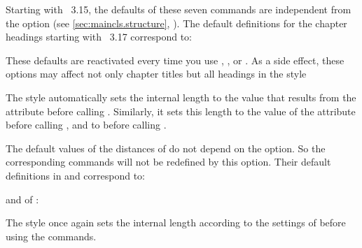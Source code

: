 Starting with \KOMAScript~3.15, the defaults of these seven commands
are independent from the  option (see
\autoref{sec:maincls.structure},
). The default definitions for the
chapter headings starting with
\KOMAScript~3.17 correspond to:
\begin{lstcode}
  \newcommand*{\chapterheadstartvskip}{\vspace{\@tempskipa}}
  \newcommand*{\chapterheadmidvskip}{\par\nobreak\vskip\@tempskipa}
  \newcommand*{\chapterheadendvskip}{\vskip\@tempskipa}
\end{lstcode}
These defaults are reactivated every time you use
,
, or
. As a side effect, these options may
affect not only chapter titles but all headings in the  style

The  style automatically sets the internal length
 to the value that results from the
attribute  before calling .
Similarly, it sets this length to the value of the 
attribute before calling , and to
 before calling .

The default values of the distances of  do not
depend on the  option. So the corresponding
commands will not be redefined by this option.
Their default definitions in  and 
correspond to:
\begin{lstcode}
  \newcommand*{\partheadstartvskip}{%
    \null\vskip-\baselineskip\vskip\@tempskipa
  }
  \newcommand*{\partheadmidvskip}{%
    \par\nobreak
    \vskip\@tempskipa
  }
  \newcommand*{\partheadendvskip}{%
    \vskip\@tempskipa\newpage
  }
\end{lstcode}
and of :
\begin{lstcode}
  \newcommand*{\partheadstartvskip}{%
    \addvspace{\@tempskipa}%
  }
  \newcommand*{\partheadmidvskip}{%
    \par\nobreak
  }
  \newcommand*{\partheadendvskip}{%
    \vskip\@tempskipa
  }
\end{lstcode}
The  style once again sets the internal length
 according to the settings of
before using the commands.

